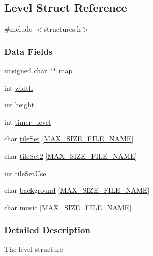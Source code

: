 \hypertarget{struct_level}{\subsection{Level Struct Reference}
\label{struct_level}
}


{\ttfamily \#include $<$structures.\-h$>$}

\subsubsection*{Data Fields}
\begin{DoxyCompactItemize}
\item 
unsigned char $\ast$$\ast$ \hyperlink{struct_level_a6d985f8729c187f1c35dabba2738f0bd}{map}
\item 
int \hyperlink{struct_level_a2474a5474cbff19523a51eb1de01cda4}{width}
\item 
int \hyperlink{struct_level_ad12fc34ce789bce6c8a05d8a17138534}{height}
\item 
int \hyperlink{struct_level_a28c59da9677a9d7b98db49328a77dc3c}{timer\-\_\-level}
\item 
char \hyperlink{struct_level_a65e1491050070e8d940ac310bb3ee901}{tile\-Set} \mbox{[}\hyperlink{const_8h_a95feb1f1a8c13ebeb7da1e49b2896c24}{M\-A\-X\-\_\-\-S\-I\-Z\-E\-\_\-\-F\-I\-L\-E\-\_\-\-N\-A\-M\-E}\mbox{]}
\item 
char \hyperlink{struct_level_a31c790abec040f1888acf0e062d1c827}{tile\-Set2} \mbox{[}\hyperlink{const_8h_a95feb1f1a8c13ebeb7da1e49b2896c24}{M\-A\-X\-\_\-\-S\-I\-Z\-E\-\_\-\-F\-I\-L\-E\-\_\-\-N\-A\-M\-E}\mbox{]}
\item 
int \hyperlink{struct_level_ad086ee40635033453f3e41bc143af7b7}{tile\-Set\-Use}
\item 
char \hyperlink{struct_level_a138d74a180ed8126b24d9b9b5b135882}{background} \mbox{[}\hyperlink{const_8h_a95feb1f1a8c13ebeb7da1e49b2896c24}{M\-A\-X\-\_\-\-S\-I\-Z\-E\-\_\-\-F\-I\-L\-E\-\_\-\-N\-A\-M\-E}\mbox{]}
\item 
char \hyperlink{struct_level_a16d4a8b2aa62b5e644923bdf44da16f7}{music} \mbox{[}\hyperlink{const_8h_a95feb1f1a8c13ebeb7da1e49b2896c24}{M\-A\-X\-\_\-\-S\-I\-Z\-E\-\_\-\-F\-I\-L\-E\-\_\-\-N\-A\-M\-E}\mbox{]}
\end{DoxyCompactItemize}


\subsubsection{Detailed Description}
The level structure 

